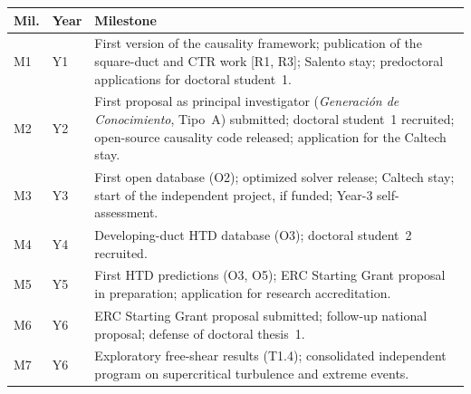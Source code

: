 \documentclass[11pt]{article}
\begin{document}
\begin{center}\small
\begin{tabularx}{\textwidth}{@{}p{0.8cm}p{1.35cm}X@{}}
\toprule
\textbf{Mil.} & \textbf{Year} & \textbf{Milestone} \\
\midrule
M1 & Y1 & First version of the causality framework; publication of the square-duct and CTR work [R1, R3]; Salento stay; predoctoral applications for doctoral student~1. \\
M2 & Y2 & First proposal as principal investigator (\emph{Generaci\'on de Conocimiento}, Tipo~A) submitted; doctoral student~1 recruited; open-source causality code released; application for the Caltech stay. \\
M3 & Y3 & First open database (O2); optimized solver release; Caltech stay; start of the independent project, if funded; Year-3 self-assessment. \\
M4 & Y4 & Developing-duct HTD database (O3); doctoral student~2 recruited. \\
M5 & Y5 & First HTD predictions (O3, O5); ERC Starting Grant proposal in preparation; application for research accreditation. \\
M6 & Y6 & ERC Starting Grant proposal submitted; follow-up national proposal; defense of doctoral thesis~1. \\
M7 & Y6 & Exploratory free-shear results (T1.4); consolidated independent program on supercritical turbulence and extreme events. \\
\bottomrule
\end{tabularx}
\end{center}
\end{document}
